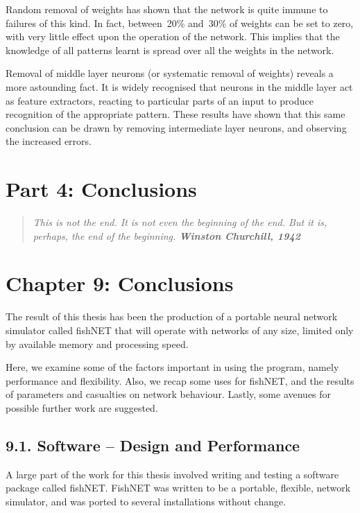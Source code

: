 \documentclass[12pt]{report}
\begin{document}
Random removal of weights has shown that the network is quite immune
to failures of this kind.
In fact, between~20\% and~30\% of weights can be set to zero, with very
little effect upon the operation of the network.
This implies that the knowledge of all patterns learnt is spread
over all the weights in the network.

Removal of middle layer neurons (or systematic removal of weights)
reveals a more astounding fact.
It is widely recognised that neurons in the middle layer act as
feature extractors, reacting to particular parts of an input to
produce recognition of the appropriate pattern.
These results have shown that this same conclusion can be drawn by
removing intermediate layer neurons, and observing the increased
errors.


\chapter*{Part 4: Conclusions}

\begin{quote}\textit{This is not the end. It is not even the beginning
of the end. But it is, perhaps, the end of the beginning. \textbf{Winston Churchill, 1942}}\end{quote}

\chapter{Chapter 9: Conclusions}

The result of this thesis has been the production of a portable
neural network simulator called fishNET that will operate with networks of any
size, limited only by available memory and processing speed.

Here, we examine some of the factors important in using the program,
namely performance and flexibility.
Also, we recap some uses for fishNET, and the results of parameters
and casualties on network behaviour.
Lastly, some avenues for possible further work are suggested.

\section{9.1. Software -- Design and Performance}

A large part of the work for this thesis involved writing and
testing a software package called fishNET.
FishNET was written to be a portable, flexible, network simulator,
and was ported to several installations without change.
\end{document}
